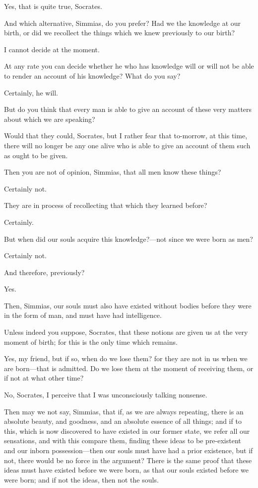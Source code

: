 Yes, that is quite true, Socrates.

And which alternative, Simmias, do you prefer? Had we the knowledge at our
birth, or did we recollect the things which we knew previously to our
birth?

I cannot decide at the moment.

At any rate you can decide whether he who has knowledge will or will not
be able to render an account of his knowledge? What do you say?

Certainly, he will.

But do you think that every man is able to give an account of these very
matters about which we are speaking?

Would that they could, Socrates, but I rather fear that to-morrow, at this
time, there will no longer be any one alive who is able to give an account
of them such as ought to be given.

Then you are not of opinion, Simmias, that all men know these things?

Certainly not.

They are in process of recollecting that which they learned before?

Certainly.

But when did our souls acquire this knowledge?—not since we were
born as men?

Certainly not.

And therefore, previously?

Yes.

Then, Simmias, our souls must also have existed without bodies before they
were in the form of man, and must have had intelligence.

Unless indeed you suppose, Socrates, that these notions are given us at
the very moment of birth; for this is the only time which remains.

Yes, my friend, but if so, when do we lose them? for they are not in us
when we are born—that is admitted. Do we lose them at the moment of
receiving them, or if not at what other time?

No, Socrates, I perceive that I was unconsciously talking nonsense.

Then may we not say, Simmias, that if, as we are always repeating, there
is an absolute beauty, and goodness, and an absolute essence of all
things; and if to this, which is now discovered to have existed in our
former state, we refer all our sensations, and with this compare them,
finding these ideas to be pre-existent and our inborn possession—then
our souls must have had a prior existence, but if not, there would be no
force in the argument? There is the same proof that these ideas must have
existed before we were born, as that our souls existed before we were
born; and if not the ideas, then not the souls.

